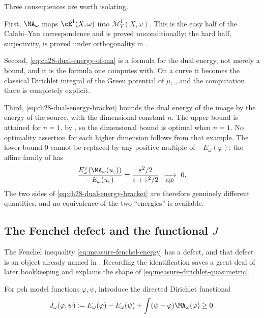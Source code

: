 \begin{remark}
\label{rem:ch28-reading-dual-of-ma}
Three consequences are worth isolating.

First, $\MA_\omega$ maps $\cE^1(X,\omega)$ into
$\mathcal M^1_V(X,\omega)$.  This is the easy half of the Calabi--Yau
correspondence and is proved unconditionally; the hard half, surjectivity,
is proved under orthogonality in
.

Second, \eqref{eq:ch28-dual-energy-of-ma} is a formula for the dual energy,
not merely a bound, and it is the formula one computes with.  On a curve it
becomes the classical Dirichlet integral of the Green potential of $\mu$,
, and the computation there is completely
explicit.

Third, \eqref{eq:ch28-dual-energy-bracket} bounds the dual energy of the
image by the energy of the source, with the dimensional constant $n$.  The
upper bound is attained for $n=1$, by
, so the dimensional bound is optimal when $n=1$.
No optimality assertion for each higher dimension follows from that example.  The lower bound $0$ cannot be replaced by any positive multiple
of $-E_\omega(\varphi)$: the affine family of
 has
\[
 \frac{E^\vee_\omega(\MA_\omega(u_\varepsilon))}
      {-E_\omega(u_\varepsilon)}
 =\frac{\varepsilon^2/2}{\varepsilon+\varepsilon^2/2}
 \ \xrightarrow[\varepsilon\downarrow0]{}\ 0 .
\]
The two sides of \eqref{eq:ch28-dual-energy-bracket} are therefore genuinely
different quantities, and no equivalence of the two ``energies'' is
available.
\end{remark}

\subsection{The Fenchel defect and the functional \texorpdfstring{$J$}{J}}
\label{sec:ch28-fenchel-defect}

The Fenchel inequality \eqref{eq:measure-fenchel-energy} has a defect, and
that defect is an object already named in .  Recording
the identification saves a great deal of later bookkeeping and explains the
shape of \eqref{eq:measure-dirichlet-quasimetric}.

For psh model functions $\varphi,\psi$, introduce the directed Dirichlet
functional
\begin{equation}
\label{eq:directed-dirichlet-functional}
 J_\omega(\varphi,\psi)
 :=E_\omega(\varphi)-E_\omega(\psi)
   +\int(\psi-\varphi)\MA_\omega(\varphi)\geq0.
\end{equation}

